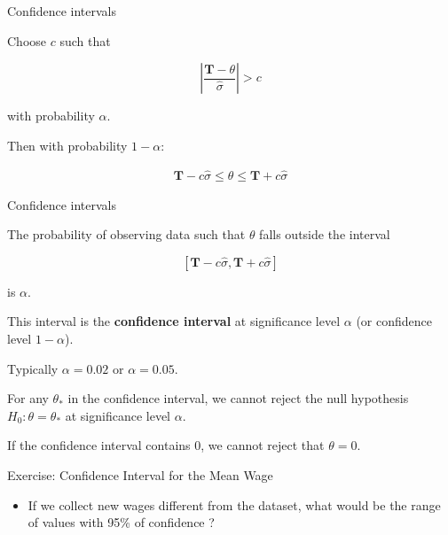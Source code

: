 \documentclass{beamer}
\begin{document}
\begin{frame}{Confidence intervals}
         
         Choose $c$ such that 

        \[ \left|\frac{\mathbf{T} - \theta}{\hat{\sigma}}\right| > c \]
         
        with probability $\alpha$.

        Then with probability $1-\alpha$:

        \[ 
    \begin{split}
                \mathbf{T} - c \hat{\sigma} \le \theta \le \mathbf{T} + c \hat{\sigma}
             \end{split}
        \]

\end{frame}

\begin{frame}{Confidence intervals}

     The probability of observing data such that $\theta$ falls outside the interval

     \[   
             [\mathbf{T} - c \hat{\sigma}, \mathbf{T} + c \hat{\sigma}]
    \]

     is $\alpha$.

    \medskip

     This interval is the \textbf{confidence interval} at significance level $\alpha$ (or confidence level $1-\alpha$).

    \medskip

    Typically $\alpha = 0.02$ or $\alpha = 0.05$.

    \medskip

     For any $\theta_*$ in the confidence interval, we cannot reject the null hypothesis $H_0: \theta = \theta_*$ at significance level $\alpha$.

    \medskip

     If the confidence interval contains $0$, we cannot reject that $\theta = 0$. 

\end{frame}
\begin{frame}[fragile]{Exercise: Confidence Interval for the Mean Wage}

\begin{itemize}
    \item If we collect new wages different from the dataset, what would be the range of values with 95\% of confidence ?
\end{itemize}
    
\end{frame}
\end{document}

